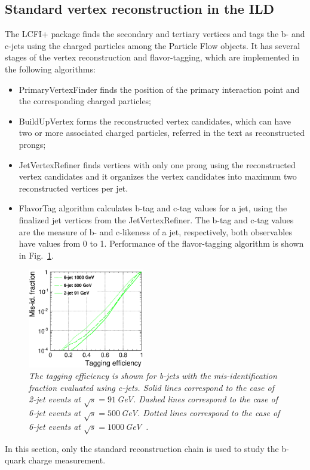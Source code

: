 

\subsection{Standard vertex reconstruction in the ILD}
The LCFI+ package finds the secondary and tertiary vertices and tags the b- and c-jets using the charged particles among the Particle Flow objects.
It has several stages of the vertex reconstruction and flavor-tagging, which are implemented in the following algorithms:
\begin{itemize}
\item PrimaryVertexFinder finds the position of the primary interaction point and the corresponding charged particles;
\item BuildUpVertex forms the reconstructed vertex candidates, which can have two or more associated charged particles, referred in the text as reconstructed prongs;
\item JetVertexRefiner finds vertices with only one prong using the reconstructed vertex candidates and it organizes the vertex candidates into maximum two reconstructed vertices per jet.
\item FlavorTag algorithm calculates b-tag and c-tag values for a jet, using the finalized jet vertices from the JetVertexRefiner. The b-tag and c-tag values are the measure of b- and c-likeness of a jet, respectively, both observables have values from 0 to 1. Performance of the flavor-tagging algorithm is shown in Fig.~\ref{fig:LCFIplus_3}.
\end{itemize}

\begin{figure}
	{\centering
		\includegraphics[width=0.45\textwidth]{ILD/graphics/btag-cbg.eps}
		\caption{\sl The tagging efficiency is shown for b-jets with the mis-identification	fraction evaluated using c-jets. Solid lines correspond to the case of 2-jet events at $\sqrt{s} = 91$\,GeV. Dashed lines correspond to the case of 6-jet events at	$\sqrt{s} = 500$\,GeV. Dotted lines correspond to the case of 6-jet events at $\sqrt{s} = 1000$\,GeV~\cite{bib:LCFI}.
		}
		\label{fig:LCFIplus_3}
	}
\end{figure}
In this section, only the standard reconstruction chain is used to study the b-quark charge measurement. 


